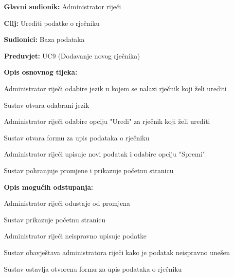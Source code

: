 				\noindent {}
				\begin{packed_item}
					
					\item \textbf{Glavni sudionik: }Administrator riječi
					\item  \textbf{Cilj:} Urediti podatke o rječniku
					\item  \textbf{Sudionici:} Baza podataka
					\item  \textbf{Preduvjet:} UC9 (Dodavanje novog rječnika)
					\item  \textbf{Opis osnovnog tijeka:}
					
					\item[] \begin{packed_enum}
						
						\item Administrator riječi odabire jezik u kojem se nalazi rječnik koji želi urediti
						\item Sustav otvara odabrani jezik
						\item Administrator riječi odabire opciju "Uredi" za rječnik koji želi urediti
						\item Sustav otvara formu za upis podataka o rječniku
						\item Administrator riječi upisuje novi podatak i odabire opciju "Spremi"
						\item Sustav pohranjuje promjene i prikazuje početnu stranicu
						
					\end{packed_enum}
					
					\item  \textbf{Opis mogućih odstupanja:}
					
					\item[] \begin{packed_item}
					
					
						\item[5.a] Administrator riječi odustaje od promjena
						\item[] \begin{packed_enum}
							
							\item Sustav prikazuje početnu stranicu
							
						\end{packed_enum}
						
						\item[5.b] Administrator riječi neispravno upisuje podatke
						\item[] \begin{packed_enum}
							
							\item Sustav obavještava administratora riječi kako je podatak neispravno unešen
							\item Sustav ostavlja otvorenu formu za upis podataka o rječniku
							
						\end{packed_enum}
					\end{packed_item}
				\end{packed_item}
				
